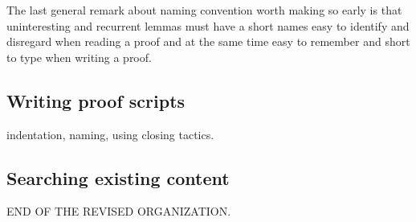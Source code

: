 The last general remark about naming convention worth making so early is that
uninteresting and recurrent lemmas must have a short names easy to identify and
disregard when reading a proof and at the same time easy to remember and short
to type when writing a proof.


\subsection{Writing proof scripts}

indentation, naming, using closing tactics.

\subsection{Searching existing content}

END OF THE REVISED ORGANIZATION.

